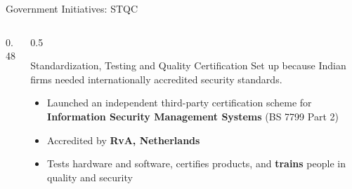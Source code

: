 \documentclass[aspectratio=169,11pt,xcolor={table}]{beamer}
\begin{document}
\begin{frame}{Government Initiatives: STQC}
  \begin{columns}[c]
    \begin{column}{0.48\textwidth}
      \centering
    \end{column}
    \begin{column}{0.5\textwidth}
      \begin{block}{Standardization, Testing and Quality Certification}
        \small Set up because Indian firms needed internationally accredited security standards.
      \end{block}
      \begin{itemize}\small\setlength{\itemsep}{3pt}
        \item Launched an independent third-party certification scheme for \textbf{Information Security Management Systems} (BS 7799 Part 2)
        \item Accredited by \textbf{RvA, Netherlands}
        \item Tests hardware and software, certifies products, and \textbf{trains} people in quality and security
      \end{itemize}
    \end{column}
  \end{columns}
\end{frame}
\end{document}
